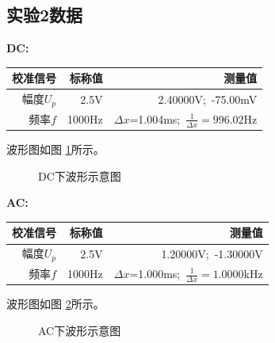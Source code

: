\documentclass[a4paper,11pt,UTF8]{ctexart}
\begin{document}
\subsection{实验2数据}
	\textbf{DC:}
	\begin{center}
	\begin{tabular}{|r|r|r|}\hline
	校准信号 & 标称值 & 测量值\\\hline
	幅度$U_p$ & 2.5V & 2.40000V;~-75.00mV\\\hline
	频率$f$ & 1000Hz & $\Delta x$=1.004ms;~$\frac{1}{\Delta x}=996.02$Hz\\\hline
		\end{tabular}
		\end{center}
    波形图如图 \ref{fig:DC}所示。
    \begin{figure}[htbp]
    \centering
    \caption{DC下波形示意图}
    \label{fig:DC}
    \end{figure}
	\par\textbf{AC:}
	\begin{center}
	\begin{tabular}{|r|r|r|}\hline
	校准信号 & 标称值 & 测量值\\\hline
	幅度$U_p$ & 2.5V & 1.20000V;~-1.30000V\\\hline
	频率$f$ & 1000Hz & $\Delta x$=1.000ms;~$\frac{1}{\Delta x}=1.0000$kHz\\\hline
		\end{tabular}
		\end{center}
    波形图如图 \ref{fig:AC}所示。
    \begin{figure}[htbp]
    \centering
    \caption{AC下波形示意图}
    \label{fig:AC}
    \end{figure}
\end{document}
